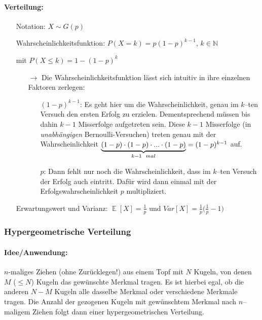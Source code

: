 \documentclass[a4paper]{article}
\DeclareMathOperator*{\E}{\mathbb{E}}
\begin{document}
\paragraph{Verteilung:}
\begin{itemize}
\item[] Notation: $X\sim G(p)$
\item[] Wahrscheinlichkeitsfunktion: $P(X=k)=p(1-p)^{k-1}$, $k \in \mathbb{N}$
\item[] \hspace{4.5cm} mit $P(X \leq k)=1-(1-p)^k$
	\begin{itemize}
	\item[$\rightarrow$] Die Wahrscheinlichkeitsfunktion lässt sich intuitiv in ihre einzelnen Faktoren zerlegen:
		\begin{itemize}
		\item[] $(1-p)^{k-1}$: Es geht hier um die Wahrscheinlichkeit, genau im $k$--ten Versuch den ersten Erfolg zu erzielen. Dementsprechend müssen bis dahin $k-1$ Misserfolge aufgetreten sein. Diese $k-1$ Misserfolge (in \textit{unabhängigen} Bernoulli-Versuchen) treten genau mit der Wahrscheinlichkeit $\underbrace{(1-p)\cdot(1-p)\cdot ... \cdot (1-p)}_{k-1 \hspace{0.2cm} mal} = (1-p)^{k-1}$ auf.
		\item[] $p$: Dann fehlt nur noch die Wahrscheinlichkeit, dass im $k$--ten Versuch der Erfolg auch eintritt. Dafür wird dann einmal mit der Erfolgswahrscheinlichkeit $p$ multipliziert.
		\end{itemize}
	\end{itemize}
\item[] Erwartungswert und Varianz: $\E[X]=\frac{1}{p}$ und $Var[X]=\frac{1}{p}\Big(\frac{1}{p}-1\Big)$
\end{itemize}

\noindent {}

\subsubsection{Hypergeometrische Verteilung} \label{sec:hypergeo}

\paragraph{Idee/Anwendung:} $n$-maliges Ziehen (ohne Zurücklegen!) aus einem Topf mit $N$ Kugeln, von denen $M$ ($ \leq N$) Kugeln das gewünschte Merkmal tragen. Es ist hierbei egal, ob die anderen $N-M$ Kugeln alle dasselbe Merkmal oder verschiedene Merkmale tragen. Die Anzahl der gezogenen Kugeln mit gewünschtem Merkmal nach $n$--maligem Ziehen folgt dann einer hypergeometrischen Verteilung.
\end{document}

